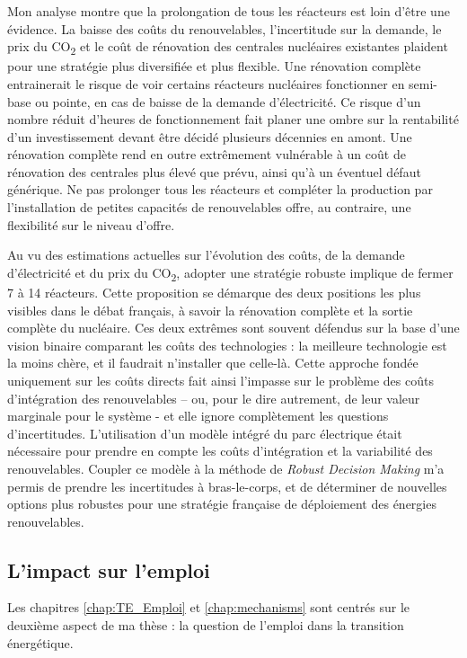 Mon analyse montre que la prolongation de tous les réacteurs est loin d’être une évidence. La baisse des coûts du renouvelables, l’incertitude sur la demande, le prix du CO\textsubscript{2} et le coût de rénovation des centrales nucléaires existantes plaident pour une stratégie plus diversifiée et plus flexible. 
Une rénovation complète entrainerait le risque de voir certains réacteurs nucléaires fonctionner en semi-base ou pointe, en cas de baisse de la demande d’électricité. Ce risque d'un nombre réduit d'heures de fonctionnement fait planer une ombre sur la rentabilité d'un investissement devant être décidé plusieurs décennies en amont.
Une rénovation complète rend en outre extrêmement vulnérable à un coût de rénovation des centrales plus élevé que prévu, ainsi qu'à un éventuel défaut générique. 
Ne pas prolonger tous les réacteurs et compléter la production par l'installation de petites capacités de renouvelables offre, au contraire, une flexibilité sur le niveau d'offre.

Au vu des estimations actuelles sur l'évolution des coûts, de la demande d'électricité et du prix du CO\textsubscript{2}, adopter une stratégie robuste implique de fermer 7 à 14 réacteurs. Cette proposition se démarque des deux positions les plus visibles dans le débat français, à savoir la rénovation complète et la sortie complète du nucléaire. Ces deux extrêmes sont souvent défendus sur la base d’une vision binaire comparant les coûts des technologies : la meilleure technologie est la moins chère, et il faudrait n'installer que celle-là. Cette approche fondée uniquement sur les coûts directs fait ainsi l’impasse sur le problème des coûts d’intégration des renouvelables – ou, pour le dire autrement, de leur valeur marginale pour le système - et elle ignore complètement les questions d’incertitudes. L'utilisation d'un modèle intégré du parc électrique était nécessaire pour prendre en compte les coûts d'intégration et la variabilité des renouvelables. Coupler ce modèle à la méthode de \textit{Robust Decision Making} m'a permis de prendre les incertitudes à bras-le-corps, et de déterminer de nouvelles options plus robustes pour une stratégie française de déploiement des énergies renouvelables.

\subsection{L'impact sur l'emploi}

Les chapitres \ref{chap:TE_Emploi} et \ref{chap:mechanisms} sont centrés sur le deuxième aspect de ma thèse : la question de l’emploi dans la transition énergétique.

